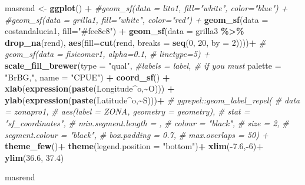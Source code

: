 \documentclass[
]{article}
\newenvironment{Shaded}{\begin{snugshade}}{\end{snugshade}}
\newcommand{\AttributeTok}[1]{\textcolor[rgb]{0.13,0.29,0.53}{#1}}
\newcommand{\CommentTok}[1]{\textcolor[rgb]{0.56,0.35,0.01}{\textit{#1}}}
\newcommand{\DecValTok}[1]{\textcolor[rgb]{0.00,0.00,0.81}{#1}}
\newcommand{\FloatTok}[1]{\textcolor[rgb]{0.00,0.00,0.81}{#1}}
\newcommand{\FunctionTok}[1]{\textcolor[rgb]{0.13,0.29,0.53}{\textbf{#1}}}
\newcommand{\NormalTok}[1]{#1}
\newcommand{\OtherTok}[1]{\textcolor[rgb]{0.56,0.35,0.01}{#1}}
\newcommand{\SpecialCharTok}[1]{\textcolor[rgb]{0.81,0.36,0.00}{\textbf{#1}}}
\newcommand{\StringTok}[1]{\textcolor[rgb]{0.31,0.60,0.02}{#1}}
\begin{document}
\begin{Shaded}
\begin{Highlighting}[]
\NormalTok{masrend }\OtherTok{\textless{}{-}} \FunctionTok{ggplot}\NormalTok{() }\SpecialCharTok{+}
  \CommentTok{\#geom\_sf(data = lito1, fill="white", color="blue") +}
  \CommentTok{\#geom\_sf(data = grilla1, fill="white", color="red") +}
  \FunctionTok{geom\_sf}\NormalTok{(}\AttributeTok{data =}\NormalTok{ costandalucia1, }\AttributeTok{fill=}\StringTok{"\#fee8c8"}\NormalTok{) }\SpecialCharTok{+}
  \FunctionTok{geom\_sf}\NormalTok{(}\AttributeTok{data =}\NormalTok{ grilla3 }\SpecialCharTok{\%\textgreater{}\%} 
          \FunctionTok{drop\_na}\NormalTok{(rend), }
          \FunctionTok{aes}\NormalTok{(}\AttributeTok{fill=}\FunctionTok{cut}\NormalTok{(rend,}
                       \AttributeTok{breaks =} \FunctionTok{seq}\NormalTok{(}\DecValTok{0}\NormalTok{, }\DecValTok{20}\NormalTok{, }\AttributeTok{by =} \DecValTok{2}\NormalTok{))))}\SpecialCharTok{+}
  \CommentTok{\# geom\_sf(data = fisicomar1, alpha=0.1,}
  \CommentTok{\#         linetype=5) +}
  \FunctionTok{scale\_fill\_brewer}\NormalTok{(}\AttributeTok{type =} \StringTok{"qual"}\NormalTok{,}
                    \CommentTok{\#labels = label, \# if you must}
                    \AttributeTok{palette =} \StringTok{"BrBG,"}\NormalTok{,}
                    \AttributeTok{name =} \StringTok{"CPUE"}\NormalTok{) }\SpecialCharTok{+}
    \FunctionTok{coord\_sf}\NormalTok{() }\SpecialCharTok{+}
  \FunctionTok{xlab}\NormalTok{(}\FunctionTok{expression}\NormalTok{(}\FunctionTok{paste}\NormalTok{(Longitude}\SpecialCharTok{\^{}}\NormalTok{o,}\SpecialCharTok{\textasciitilde{}}\StringTok{\textquotesingle{}O\textquotesingle{}}\NormalTok{))) }\SpecialCharTok{+}
  \FunctionTok{ylab}\NormalTok{(}\FunctionTok{expression}\NormalTok{(}\FunctionTok{paste}\NormalTok{(Latitude}\SpecialCharTok{\^{}}\NormalTok{o,}\SpecialCharTok{\textasciitilde{}}\StringTok{\textquotesingle{}S\textquotesingle{}}\NormalTok{)))}\SpecialCharTok{+}
  \CommentTok{\# ggrepel::geom\_label\_repel(}
  \CommentTok{\#   data = zonapro1,}
  \CommentTok{\#   aes(label = ZONA, geometry = geometry),}
  \CommentTok{\#   stat = "sf\_coordinates",}
  \CommentTok{\#   min.segment.length = ,}
  \CommentTok{\#   colour = "black",}
  \CommentTok{\#   size = 2,}
  \CommentTok{\#   segment.colour = "black",}
  \CommentTok{\#   box.padding = 0.7,}
  \CommentTok{\#   max.overlaps = 50) +}
  \FunctionTok{theme\_few}\NormalTok{()}\SpecialCharTok{+}
  \FunctionTok{theme}\NormalTok{(}\AttributeTok{legend.position =} \StringTok{"bottom"}\NormalTok{)}\SpecialCharTok{+}
  \FunctionTok{xlim}\NormalTok{(}\SpecialCharTok{{-}}\FloatTok{7.6}\NormalTok{,}\SpecialCharTok{{-}}\DecValTok{6}\NormalTok{)}\SpecialCharTok{+}
  \FunctionTok{ylim}\NormalTok{(}\FloatTok{36.6}\NormalTok{, }\FloatTok{37.4}\NormalTok{)}

\NormalTok{masrend}
\end{Highlighting}
\end{Shaded}
\end{document}
